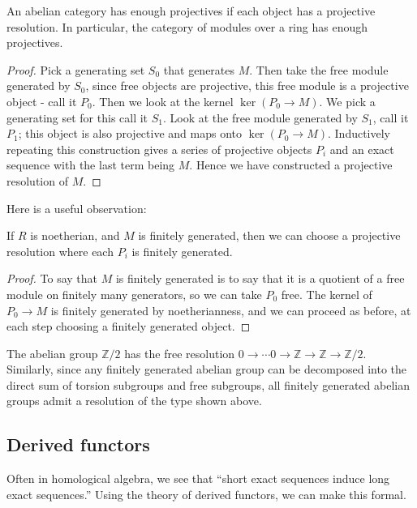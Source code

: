 \begin{theorem}An abelian category has enough projectives if each object has a
projective resolution. In particular, the category of modules over a ring has
enough projectives. \end{theorem}
\begin{proof} Pick a generating set $S_0$ that generates $M$. Then take the free
module generated by $S_0$, since free objects are projective, this free module
is a projective object - call it $P_0$. Then we look at the kernel
$\ker(P_0\rightarrow M)$. We pick a generating set for this call it $S_1$. Look
at the free module generated by $S_1$, call it $P_1$; this object is also
projective and maps onto $\ker(P_0\rightarrow M)$. Inductively repeating this
construction gives a series of projective objects $P_i$ and an exact sequence
with the last term being $M$. Hence we have constructed a projective resolution
of $M$. \end{proof}

Here is a useful observation:
\begin{proposition} 
If $R$ is noetherian, and $M$ is finitely generated, then we can choose a
projective resolution where each $P_i$ is finitely generated. 
\end{proposition} 
\begin{proof} 
To say that $M$ is finitely generated is to say that it is a quotient of a free module on
finitely many generators, so we can take $P_0$ free. The kernel of $P_0 \to M$
is finitely generated by noetherianness, and we can proceed as before, at each step
choosing a finitely generated object. 
\end{proof} 
\begin{example} The abelian group $\mathbb{Z}/2$ has the free resolution $0\rightarrow\cdots 0\rightarrow\mathbb{Z}\rightarrow\mathbb{Z}\rightarrow\mathbb{Z}/2$.
Similarly, since any finitely generated abelian group can be decomposed into the direct sum of torsion subgroups and free subgroups, all finitely generated abelian groups admit a resolution of the type shown above.\end{example}

\subsection{Derived functors}
Often in homological algebra, we see that ``short exact sequences induce long exact sequences.'' Using the theory of derived functors, we can make this formal.

